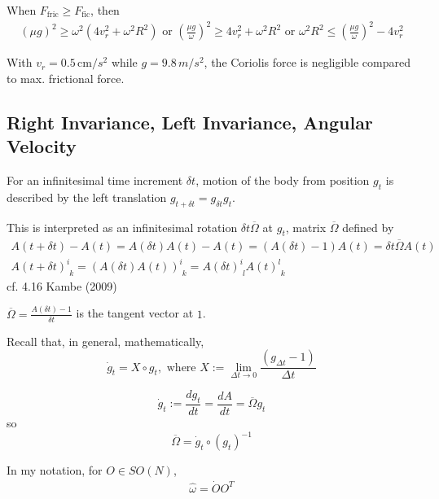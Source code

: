 When $F_{\text{fric}} \geq F_{\text{fic}}$, then 
\[
\begin{gathered}
	(\mu g)^2 \geq \omega^2 (4 v_r^2 + \omega^2 R^2) \text{ or } \left( \frac{ \mu g}{\omega} \right)^2 \geq 4 v_r^2 + \omega^2 R^2 \text{ or } \omega^2 R^2 \leq \left( \frac{\mu g}{\omega} \right)^2 - 4 v_r^2
\end{gathered}
\]

With $v_r = 0.5 \, \text{cm}/s^2 $ while $g = 9.8 \, m/s^2$, the Coriolis force is negligible compared to max. frictional force.

\subsection{Right Invariance, Left Invariance, Angular Velocity}

For an infinitesimal time increment $\delta t$, motion of the body from position $g_t$ is described by the left translation $g_{t+\delta t} = g_{\delta t}g_t$. 

This is interpreted as an infinitesimal rotation $\delta t \overline{\Omega}$ at $g_t$, matrix $\overline{\Omega}$ defined by 
\begin{equation}
\begin{gathered}
A(t + \delta t) - A(t) = A(\delta t) A(t) - A(t) = (A(\delta t) - 1) A(t) = \delta t \overline{\Omega} A(t) \\
A(t+\delta t)^i_{\, \, k} = (A(\delta t) A(t) )^i_{\, \, k} = A(\delta t)^i_{\, \, l} A(t)^l_{\, \, k}
\end{gathered}
\end{equation}
cf. 4.16 Kambe (2009) \cite{dgdt:TKambe2009}

$\overline{\Omega} = \frac{ A(\delta t) - 1}{ \delta t}$ is the tangent vector at $1$. 

Recall that, in general, mathematically, 
\[
\dot{g}_t = X \circ g_t, \text{ where } X := \lim_{\Delta t \to 0} \frac{(g_{\Delta t} - 1 ) }{ \Delta t}
\]

\begin{equation}\label{dgdt:Eq:TangentVectorAsRightInvariantForm}
\dot{g}_t := \frac{dg_t}{dt} = \frac{dA}{dt} = \overline{\Omega} g_t
\end{equation}
so 
\begin{equation}
\overline{\Omega} = \dot{g}_t \circ (g_t)^{-1}
\end{equation}

In my notation, for $O \in SO(N)$,
\begin{equation}
	\begin{gathered}
		\widehat{\omega} = \dot{O} O^T		
	\end{gathered}
\end{equation}

